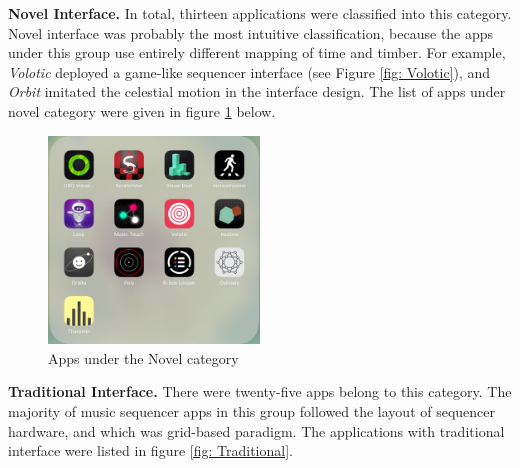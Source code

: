 \textbf{Novel Interface.} In total, thirteen applications
were classified into this category. Novel interface was probably the most intuitive classification, because the apps under this group use entirely different mapping of time and timber. For example, \textit{Volotic} deployed a game-like sequencer interface (see Figure \ref{fig: Volotic}), and \textit{Orbit} imitated the celestial motion in the interface design. The list of apps under novel category were given in figure \ref{fig: Novel} below.

\bigskip
\begin{figure}[h]
  \includegraphics[width=0.5\textwidth]{images/Novel.png}
  \centering
  \caption{Apps under the Novel category}
  \label{fig: Novel}
\end{figure}
\bigskip

\textbf{Traditional Interface.} There were twenty-five apps belong to this category. The majority of music sequencer apps in this group followed the layout of sequencer hardware, and which was grid-based paradigm. The applications with traditional interface were listed in figure \ref{fig: Traditional}.

